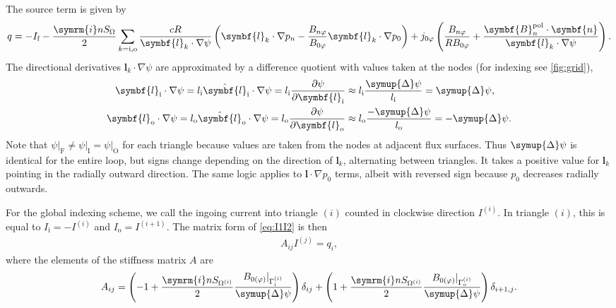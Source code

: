 \documentclass[a4paper, 10pt, english]{article}
\let\temp\vartheta
\let\vartheta\theta
\let\theta\temp
\let\temp\varphi
\let\varphi\phi
\let\phi\temp
\let\vec\symbf
\newcommand*\im{\ensuremath{\symrm{i}}}  %
\newcommand*\pd[2][]{\ensuremath{\frac{\partial #1}{\partial #2}}}  %
\newcommand*\pol{\ensuremath{\textrm{pol}}}  %
\newcommand*\fs{\ensuremath{\textrm{f}}}  %
\newcommand*\inw{\ensuremath{\textrm{i}}}  %
\newcommand*\out{\ensuremath{\textrm{o}}}  %
\newcommand*\vfs{\ensuremath{\textrm{F}}}  %
\newcommand*\vinw{\ensuremath{\textrm{I}}}  %
\newcommand*\vout{\ensuremath{\textrm{O}}}  %
\begin{document}
The source term is given by
\begin{gather}
  q = -I_{\fs} - \frac{\im n S_{\Omega}}{2} \sum_{k = \inw, \out} \frac{c R}{\vec{l}_{k} \cdot \nabla \psi} \left( \vec{l}_{k} \cdot \nabla p_{n} - \frac{B_{n \phi}}{B_{0 \phi}} \vec{l}_{k} \cdot \nabla p_{0} \right) + j_{0 \phi} \left( \frac{B_{n \phi}}{R B_{0 \phi}} + \frac{\vec{B}_{n}^{\pol} \cdot \vec{n}}{\vec{l}_{k} \cdot \nabla \psi} \right).
\end{gather}
The directional derivatives $\vec{l}_{k} \cdot \nabla \psi$ are approximated by a difference quotient with values taken at the nodes (for indexing see \cref{fig:grid}),
\begin{align}
  \vec{l}_{\inw} \cdot \nabla \psi = l_{\inw} \hat{\vec{l}}_{\inw} \cdot \nabla \psi = l_{\inw} \pd[\psi]{\vec{l}_{\inw}} & \approx l_{\inw} \frac{\symup{\Delta} \psi}{l_{\inw}} = \symup{\Delta} \psi, \\
  \vec{l}_{\out} \cdot \nabla \psi = l_{\out} \hat{\vec{l}}_{\out} \cdot \nabla \psi = l_{\out} \pd[\psi]{\vec{l}_{\out}} & \approx l_{\out} \frac{-\symup{\Delta} \psi}{l_{\out}} = -\symup{\Delta} \psi.
\end{align}
Note that $\psi \vert_{\vfs} \neq \psi \vert_{\vinw} = \psi \vert_{\vout}$ for each triangle because values are taken from the nodes at adjacent flux surfaces. Thus $\symup{\Delta} \psi$ is identical for the entire loop, but signs change depending on the direction of $\vec{l}_{k}$, alternating between triangles. It takes a positive value for $\vec{l}_{k}$ pointing in the radially outward direction. The same logic applies to $\vec{l} \cdot \nabla p_{0}$ terms, albeit with reversed sign because $p_{0}$ decreases radially outwards.

For the global indexing scheme, we call the ingoing current into triangle $(i)$ counted in clockwise direction $I^{(i)}$. In triangle $(i)$, this is equal to $I_{\inw} = -I^{(i)}$ and $I_{\out} = I^{(i+1)}$. The matrix form of \cref{eq:I1I2} is then
\begin{gather}
  A_{ij} I^{(j)} = q_{i},
\end{gather}
where the elements of the stiffness matrix $A$ are
\begin{gather}
  A_{ij} = \left( -1 + \frac{\im n S_{\Omega^{(i)}}}{2} \frac{B_{0 (\phi)} \vert_{\Gamma_{\inw}^{(i)}}}{\symup{\Delta} \psi} \right) \delta_{i j} + \left( 1 + \frac{\im n S_{\Omega^{(i)}}}{2} \frac{B_{0 (\phi)} \vert_{\Gamma_{\out}^{(i)}}}{\symup{\Delta} \psi} \right) \delta_{i+1, j}.
\end{gather}
\end{document}

